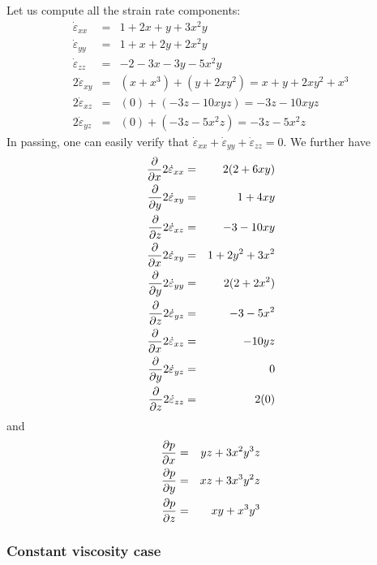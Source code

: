 Let us compute all the strain rate components:
\begin{eqnarray}
\dot{\varepsilon}_{xx}&=& 1+2x+y+3x^2y  \nonumber\\
\dot{\varepsilon}_{yy}&=& 1+x+2y+2x^2y \nonumber\\
\dot{\varepsilon}_{zz}&=& -2-3x-3y-5x^2y \nonumber\\
2 \dot{\varepsilon}_{xy}&=& (x+x^3)+(y+2xy^2) = x+y+2xy^2+x^3 \nonumber\\
2 \dot{\varepsilon}_{xz}&=& (0)+(-3z-10xyz) = -3z -10xyz  \nonumber\\
2 \dot{\varepsilon}_{yz}&=& (0) + (-3z-5x^2z) = -3z-5x^2z   \nonumber
\end{eqnarray}
In passing, one can easily verify that 
$
\dot{\varepsilon}_{xx}
+\dot{\varepsilon}_{yy}
+\dot{\varepsilon}_{zz}=0
$.
We further have
\begin{eqnarray}
\frac{\partial}{\partial x} 2\dot{\varepsilon}_{xx}&=& 2(2 +6xy) \nonumber\\ 
\frac{\partial}{\partial y} 2\dot{\varepsilon}_{xy}&=&  1+4xy \nonumber\\
\frac{\partial}{\partial z} 2\dot{\varepsilon}_{xz}&=& -3 -10xy   \nonumber\\ 
\frac{\partial}{\partial x} 2\dot{\varepsilon}_{xy}&=& 1+2y^2+3x^2 \nonumber\\ 
\frac{\partial}{\partial y} 2\dot{\varepsilon}_{yy}&=& 2( 2+2x^2 ) \nonumber\\ 
\frac{\partial}{\partial z} 2\dot{\varepsilon}_{yz}&=& -3-5x^2   \nonumber\\
\frac{\partial}{\partial x} 2\dot{\varepsilon}_{xz}&=& -10yz \nonumber\\ 
\frac{\partial}{\partial y} 2\dot{\varepsilon}_{yz}&=& 0  \nonumber\\ 
\frac{\partial}{\partial z} 2\dot{\varepsilon}_{zz}&=& 2( 0 ) \nonumber
\end{eqnarray}
and
\begin{eqnarray}
\frac{\partial p}{\partial x} &=& yz+3x^2y^3z \nonumber\\
\frac{\partial p}{\partial y} &=& xz +3x^3y^2z \nonumber\\
\frac{\partial p}{\partial z} &=& xy+x^3y^3 \nonumber
\end{eqnarray}

\subsubsection*{Constant viscosity case}

